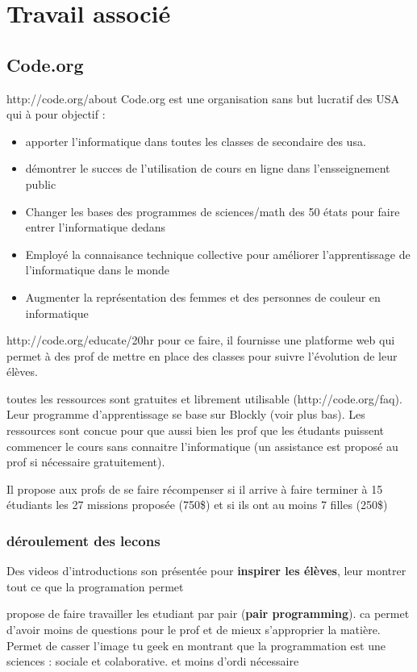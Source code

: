 \section{Travail associé}

\subsection{Code.org}
http://code.org/about
Code.org est une organisation sans but lucratif des USA qui à pour objectif :
\begin{itemize}
  \item apporter l'informatique dans toutes les classes de secondaire des usa.
  \item démontrer le succes de l'utilisation de cours en ligne dans l'ensseignement public
  \item Changer les bases des programmes de sciences/math des 50 états pour faire entrer l'informatique dedans
  \item Employé la connaisance technique collective pour améliorer l'apprentissage de l'informatique dans le monde
  \item Augmenter la représentation des femmes et des personnes de couleur en informatique
\end{itemize}

http://code.org/educate/20hr
pour ce faire, il fournisse une platforme web qui permet à des prof de mettre en place des classes pour suivre l'évolution de leur élèves.

toutes les ressources sont gratuites et librement utilisable (http://code.org/faq). Leur programme d'apprentissage se base sur Blockly (voir plus bas).
Les ressources sont concue pour que aussi bien les prof que les étudants puissent commencer le cours sans connaitre l'informatique (un assistance est proposé au prof si nécessaire gratuitement).

Il propose aux profs de se faire récompenser si il arrive à faire terminer à 15 étudiants les 27 missions proposée (750\$) et si ils ont au moins 7 filles (250\$)

\subsubsection{déroulement des lecons}
Des videos d'introductions son présentée pour \textbf{inspirer les élèves}, leur montrer tout ce que la programation permet

propose de faire travailler les etudiant par pair (\textbf{pair programming}). ca permet d'avoir moins de questions pour le prof et de mieux s'approprier la matière. Permet de casser l'image tu geek en montrant que la programmation est une sciences : sociale et colaborative. et moins d'ordi nécessaire

